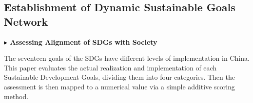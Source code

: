 \documentclass[12pt]{article}  %
\begin{document}
\subsection{Establishment of Dynamic Sustainable Goals Network}


\vspace{0.7mm}\begin{itshape}
\textbf{$\blacktriangleright$ Assessing Alignment of SDGs with Society}\end{itshape}


The seventeen goals of the SDGs have different levels of implementation in China. 
This paper evaluates the actual realization and implementation of each Sustainable Development Goals, dividing them into four categories. Then the assessment is then mapped to a numerical value via a simple additive scoring method.
\end{document}
